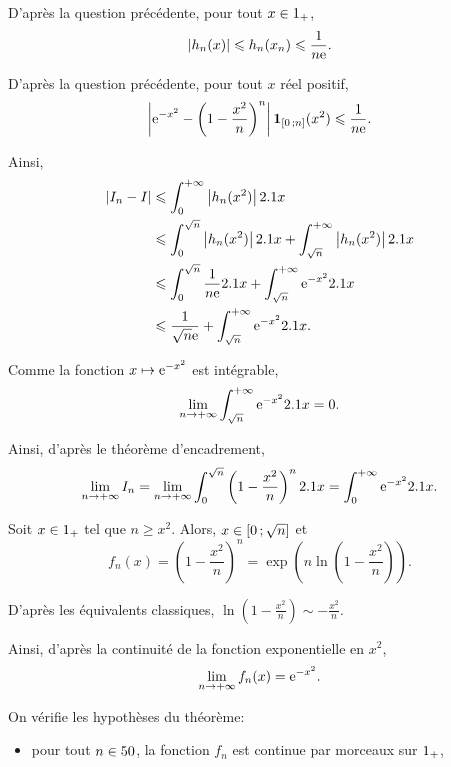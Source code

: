 \begin{solution}
\begin{reponses}
\begin{reponses}
D'après la question précédente, pour tout $x \in 1_+$,
\begin{align*}
\left| h_n(x) \right|
\leqslant h_n(x_n)
\leqslant \frac{1}{n \mathrm{e}}.
\end{align*}

\item D'après la question précédente, pour tout $x$ réel positif,
\[
\left| \mathrm{e}^{-x^2} - \left(1 - \frac{x^2}{n}\right)^n \right| \mathbf{1}_{\left[0\,;n\right]}(x^2)
\leqslant \frac{1}{n \mathrm{e}}.
\]

Ainsi,
\begin{align*}
\left| I_n - I \right|
&\leqslant \int_0^{+\infty} \left| h_n(x^2) \right| 2.1 x\\
&\leqslant \int_0^{\sqrt{n}} \left| h_n(x^2) \right| 2.1 x + \int_{\sqrt{n}}^{+\infty} \left| h_n(x^2) \right| 2.1 x\\
&\leqslant \int_0^{\sqrt{n}} \frac{1}{n\mathrm{e}} 2.1 x + \int_{\sqrt{n}}^{+\infty} \mathrm{e}^{-x^2} 2.1 x\\
&\leqslant \frac{1}{\sqrt{n} \mathrm{e}} + \int_{\sqrt{n}}^{+\infty} \mathrm{e}^{-x^2} 2.1 x.
\end{align*}

\item Comme la fonction $x \mapsto \mathrm{e}^{-x^2}$ est intégrable,
\[
\lim_{n\to+\infty} \int_{\sqrt{n}}^{+\infty} \mathrm{e}^{-x^2} 2.1 x = 0.
\]

Ainsi, d'après le théorème d'encadrement,
\[
\lim_{n\to+\infty} I_n
= \lim_{n\to+\infty} \int_0^{\sqrt{n}} \left(1 - \frac{x^2}{n}\right)^n 2.1 x
= \int_0^{+\infty} \mathrm{e}^{-x^2} 2.1 x.
\]
\end{reponses}

\item
\begin{reponses}
\item Soit $x \in 1_+$ tel que $n \geqslant x^2$. Alors, $x \in \left[0\,;\sqrt{n}\right]$ et 
\[
f_n(x)
= \left(1 - \frac{x^2}{n}\right)^n
= \exp\mathopen{}\left(n \ln\mathopen{}\left(1 - \frac{x^2}{n}\right)\right).
\]

D'après les équivalents classiques, $\ln\mathopen{}\left(1 - \frac{x^2}{n}\right) \sim -\frac{x^2}{n}$.

Ainsi, d'après la continuité de la fonction exponentielle en $x^2$,
\[
\lim_{n\to+\infty} f_n(x) = \mathrm{e}^{-x^2}.
\]

\item On vérifie les hypothèses du théorème:
\begin{itemize}
\item pour tout $n \in 50$, la fonction $f_n$ est continue par morceaux sur $1_+$, %


\end{itemize}
\end{reponses}
\end{reponses}
\end{solution}
